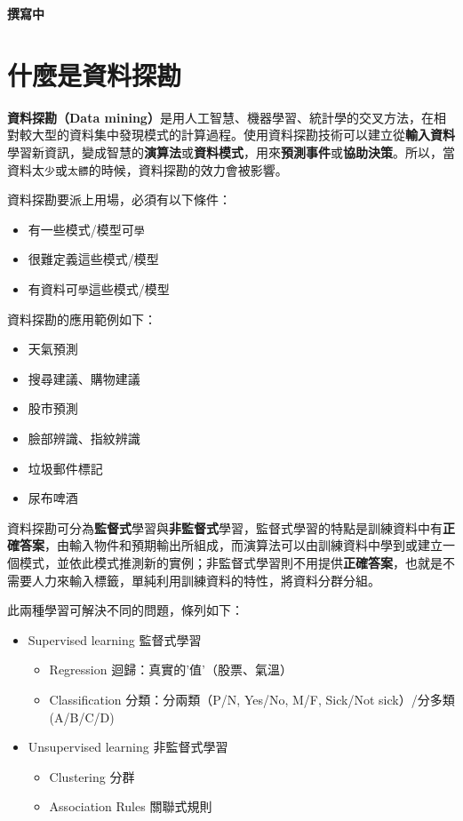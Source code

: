 \documentclass[]{book}
\providecommand{\tightlist}{%
  \setlength{\itemsep}{0pt}\setlength{\parskip}{0pt}}
\begin{document}
\textbf{撰寫中}

\hypertarget{ux4ec0ux9ebcux662fux8cc7ux6599ux63a2ux52d8}{%
\section{什麼是資料探勘}\label{ux4ec0ux9ebcux662fux8cc7ux6599ux63a2ux52d8}}

\textbf{資料探勘（Data mining）}是用人工智慧、機器學習、統計學的交叉方法，在相對較大型的資料集中發現模式的計算過程。使用資料探勘技術可以建立從\textbf{輸入資料}學習新資訊，變成智慧的\textbf{演算法}或\textbf{資料模式}，用來\textbf{預測事件}或\textbf{協助決策}。所以，當資料太\texttt{少}或\texttt{太髒}的時候，資料探勘的效力會被影響。

資料探勘要派上用場，必須有以下條件：

\begin{itemize}
\tightlist
\item
  有一些模式/模型可\texttt{學}
\item
  很難定義這些模式/模型
\item
  有資料可\texttt{學}這些模式/模型
\end{itemize}

資料探勘的應用範例如下：

\begin{itemize}
\tightlist
\item
  天氣預測
\item
  搜尋建議、購物建議
\item
  股市預測
\item
  臉部辨識、指紋辨識
\item
  垃圾郵件標記
\item
  尿布啤酒
\end{itemize}

資料探勘可分為\textbf{監督式}學習與\textbf{非監督式}學習，監督式學習的特點是訓練資料中有\textbf{正確答案}，由輸入物件和預期輸出所組成，而演算法可以由訓練資料中學到或建立一個模式，並依此模式推測新的實例；非監督式學習則不用提供\textbf{正確答案}，也就是不需要人力來輸入標籤，單純利用訓練資料的特性，將資料分群分組。

此兩種學習可解決不同的問題，條列如下：

\begin{itemize}
\tightlist
\item
  Supervised learning 監督式學習

  \begin{itemize}
  \tightlist
  \item
    Regression 迴歸：真實的'值'（股票、氣溫）
  \item
    Classification 分類：分兩類（P/N, Yes/No, M/F, Sick/Not sick）/分多類 (A/B/C/D)
  \end{itemize}
\item
  Unsupervised learning 非監督式學習

  \begin{itemize}
  \tightlist
  \item
    Clustering 分群
  \item
    Association Rules 關聯式規則
  \end{itemize}
\end{itemize}
\end{document}
